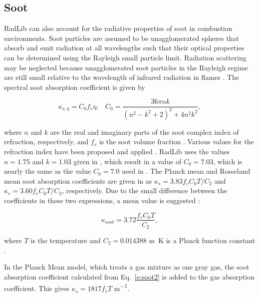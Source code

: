 \documentclass[preprint,12pt, a4paper]{elsarticle}
\begin{document}

\subsection{Soot} \label{s:soot}

RadLib can also account for the radiative properties of soot in combustion environments. Soot particles are assumed to be unagglomerated spheres that absorb and emit radiation at all wavelengths such that their optical properties can be determined using the Rayleigh small particle limit. Radiation scattering may be neglected because unagglomerated soot particles in the Rayleigh regime are still small relative to the wavelength of infrared radiation in flames \cite{Brewster_1992,Solovjov_2001}. The spectral soot absorption coefficient is given by 
%
\begin{linenomath}
\begin{equation}
\label{e:soot1}
	\kappa_{s,\eta}=C_0 f_v \eta, \; \; \; C_0 = \frac{36\pi n k}{(n^2-k^2+2)^2+4n^2k^2},
\end{equation}
\end{linenomath}
%
where $n$ and $k$ are the real and imaginary parts of the soot complex index of refraction, respectively, and $f_v$ is the soot volume fraction \cite{Solovjov_2001,Modest_2013}. Various values for the refraction index have been proposed and applied \cite{Lee_1981,Stull_1960,Dalzell_1969,Howarth_1966,Chang_1990,Felske_1984,Williams_2007}. 
RadLib uses the values $n=1.75$ and $k=1.03$ given in \cite{Williams_2007}, which result in a value of $C_0=7.03$, which is nearly the same as the value $C_0=7.0$ used in \cite{Solovjov_2001}. 
The Planck mean and Rosseland mean soot absorption coefficients are given in \cite{Modest_2013} as $\kappa_s=3.83f_vC_0T/C_2$ and $\kappa_s=3.60f_vC_0T/C_2$, respectively.
Due to the small difference between the coefficients in these two expressions, a mean value is suggested \cite{Felske_1977,Modest_2013}:
%
\begin{linenomath}
\begin{equation}
\label{e:soot2}
	\kappa_{soot}=3.72\frac{f_vC_0T}{C_2},
\end{equation}
\end{linenomath}
%
where $T$ is the temperature and $C_2=0.014388$ \si{m.K} is a Planck function constant \cite{Modest_2013}. 

In the Planck Mean model, which treats a gas mixture as one gray gas, the soot absorption coefficient calculated from Eq.~\ref{e:soot2} is added to the gas absorption coefficient. This gives $\kappa_s=1817f_vT$ \si{m^{-1}}.
 
\end{document}
